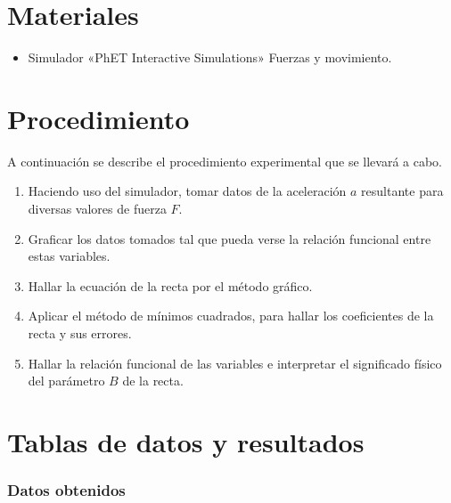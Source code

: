 \documentclass[letter,11pt]{article}
\begin{document}
\section{Materiales}
\begin{itemize}
\item Simulador «PhET Interactive Simulations» Fuerzas y movimiento.
\end{itemize}

\section{Procedimiento}
A continuación se describe el procedimiento experimental que se llevará a
cabo.

\begin{enumerate}
\item Haciendo uso del simulador, tomar datos de la aceleración $a$ resultante
    para diversas valores de fuerza $F$.
\item Graficar los datos tomados tal que pueda verse la relación funcional entre
    estas variables.
\item Hallar la ecuación de la recta por el método gráfico.
\item Aplicar el método de mínimos cuadrados, para hallar los coeficientes de la
    recta y sus errores.
\item Hallar la relación funcional de las variables e interpretar el significado
    físico del parámetro $B$ de la recta.
\end{enumerate}

\section{Tablas de datos y resultados}

\subsubsection{Datos obtenidos}
\end{document}
